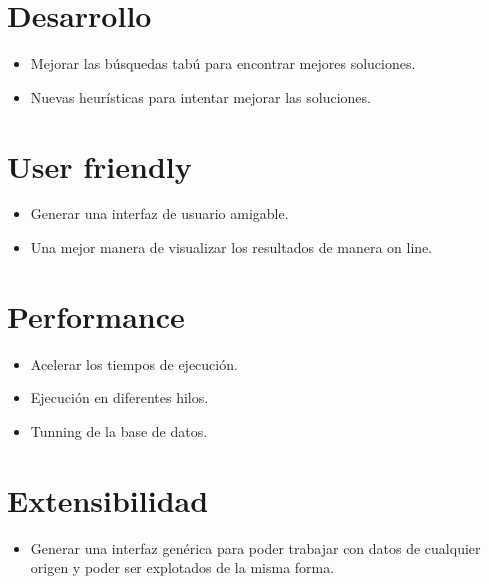 \section{Desarrollo}
\begin{itemize}
 \item Mejorar las búsquedas tabú para encontrar mejores soluciones.
 \item Nuevas heurísticas para intentar mejorar las soluciones.
\end{itemize}


\section{User friendly}
\begin{itemize}
 \item Generar una interfaz de usuario amigable.
 \item Una mejor manera de visualizar los resultados de manera on line.
\end{itemize}

\section{Performance}
\begin{itemize}
 \item Acelerar los tiempos de ejecución.
 \item Ejecución en diferentes hilos.
 \item Tunning de la base de datos.
\end{itemize}

\section{Extensibilidad}
\begin{itemize}
 \item Generar una interfaz genérica para poder trabajar con datos de cualquier origen y poder ser explotados de la misma forma.
\end{itemize}

